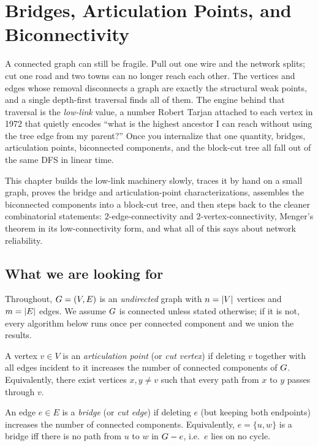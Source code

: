 \chapter{Bridges, Articulation Points, and Biconnectivity}

A connected graph can still be fragile. Pull out one wire and the network splits;
cut one road and two towns can no longer reach each other. The vertices and edges
whose removal disconnects a graph are exactly the structural weak points, and a
single depth-first traversal finds all of them. The engine behind that traversal is
the \emph{low-link} value, a number Robert Tarjan attached to each vertex in 1972
that quietly encodes ``what is the highest ancestor I can reach without using the
tree edge from my parent?'' Once you internalize that one quantity, bridges,
articulation points, biconnected components, and the block-cut tree all fall out of
the same DFS in linear time.

This chapter builds the low-link machinery slowly, traces it by hand on a small
graph, proves the bridge and articulation-point characterizations, assembles the
biconnected components into a block-cut tree, and then steps back to the cleaner
combinatorial statements: $2$-edge-connectivity and $2$-vertex-connectivity, Menger's
theorem in its low-connectivity form, and what all of this says about network
reliability.

\chapterline

\section{What we are looking for}
\label{ch10:setup}

Throughout, $G=(V,E)$ is an \emph{undirected} graph with $n=\lvert V\rvert$ vertices and
$m=\lvert E\rvert$ edges. We assume $G$ is connected unless stated otherwise; if it is
not, every algorithm below runs once per connected component and we union the
results.

\begin{definition}
\label{ch10:def-artic}
A vertex $v\in V$ is an \emph{articulation point} (or \emph{cut vertex}) if deleting
$v$ together with all edges incident to it increases the number of connected
components of $G$. Equivalently, there exist vertices $x,y\neq v$ such that every
path from $x$ to $y$ passes through $v$.
\end{definition}

\begin{definition}[Bridge]
\label{ch10:def-bridge}
An edge $e\in E$ is a \emph{bridge} (or \emph{cut edge}) if deleting $e$ (but keeping
both endpoints) increases the number of connected components. Equivalently, $e=\{u,w\}$
is a bridge iff there is no path from $u$ to $w$ in $G-e$, i.e.\ $e$ lies on no
cycle.
\end{definition}

